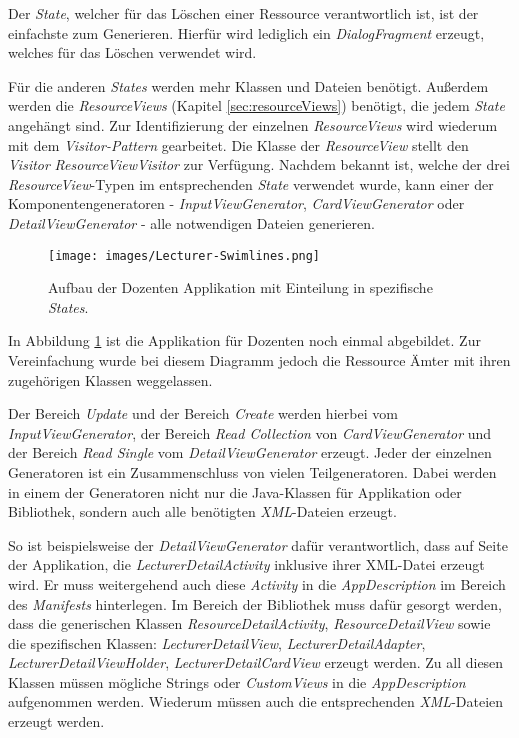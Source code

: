 Der \textit{State}, welcher für das Löschen einer Ressource verantwortlich ist, ist der einfachste zum Generieren. Hierfür wird lediglich ein \textit{DialogFragment} erzeugt, welches für das Löschen verwendet wird. 

Für die anderen \textit{States} werden mehr Klassen und Dateien benötigt. Außerdem werden die \textit{ResourceViews} (Kapitel \ref{sec:resourceViews}) benötigt, die jedem \textit{State} angehängt sind. Zur Identifizierung der einzelnen \textit{ResourceViews} wird wiederum mit dem \textit{Visitor-Pattern} gearbeitet. Die Klasse der \textit{ResourceView} stellt den \textit{Visitor} \textit{ResourceViewVisitor} zur Verfügung. 
Nachdem bekannt ist, welche der drei \textit{ResourceView}-Typen im entsprechenden \textit{State} verwendet wurde, kann einer der Komponentengeneratoren - \textit{InputViewGenerator}, \textit{CardViewGenerator} oder \textit{DetailViewGenerator} - alle notwendigen Dateien generieren.

\begin{figure}[H]
	\begin{center}
		\texttt{[image: images/Lecturer-Swimlines.png]}
		\caption{Aufbau der Dozenten Applikation mit Einteilung in spezifische \textit{States}.}
		\label{fig:swimlines}
	\end{center}
\end{figure}

In Abbildung \ref{fig:swimlines} ist die Applikation für Dozenten noch einmal abgebildet. Zur Vereinfachung wurde bei diesem Diagramm jedoch die Ressource Ämter mit ihren zugehörigen Klassen weggelassen.

Der Bereich \textit{Update} und der Bereich \textit{Create} werden hierbei vom \textit{InputViewGenerator}, der Bereich \textit{Read Collection} von \textit{CardViewGenerator} und der Bereich \textit{Read Single} vom \textit{DetailViewGenerator} erzeugt.
Jeder der einzelnen Generatoren ist ein Zusammenschluss von vielen Teilgeneratoren. Dabei werden in einem der Generatoren nicht nur die Java-Klassen für Applikation oder Bibliothek, sondern auch alle benötigten \textit{XML}-Dateien erzeugt.

\newpage

So ist beispielsweise der \textit{DetailViewGenerator} dafür verantwortlich, dass auf Seite der Applikation, die \textit{LecturerDetailActivity} inklusive ihrer XML-Datei erzeugt wird. Er muss weitergehend auch diese \textit{Activity} in die \textit{AppDescription} im Bereich des \textit{Manifests} hinterlegen. Im Bereich der Bibliothek muss dafür gesorgt werden, dass die generischen Klassen \textit{ResourceDetailActivity}, \textit{ResourceDetailView} sowie die spezifischen Klassen: \textit{LecturerDetailView}, \textit{LecturerDetailAdapter}, \textit{LecturerDetailViewHolder}, \textit{LecturerDetailCardView} erzeugt werden. Zu all diesen Klassen müssen mögliche Strings oder \textit{CustomViews} in die \textit{AppDescription} aufgenommen werden. Wiederum müssen auch die entsprechenden \textit{XML}-Dateien erzeugt werden. 

